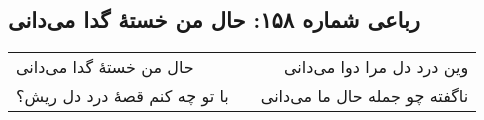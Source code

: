 \begin{center}
\section*{رباعی شماره ۱۵۸: حال من خستهٔ گدا می‌دانی}
\label{sec:158}
\begin{longtable}{l p{0.5cm} r}
حال من خستهٔ گدا می‌دانی
&&
وین درد دل مرا دوا می‌دانی
\\
با تو چه کنم قصهٔ درد دل ریش؟
&&
ناگفته چو جمله حال ما می‌دانی
\\
\end{longtable}
\end{center}
